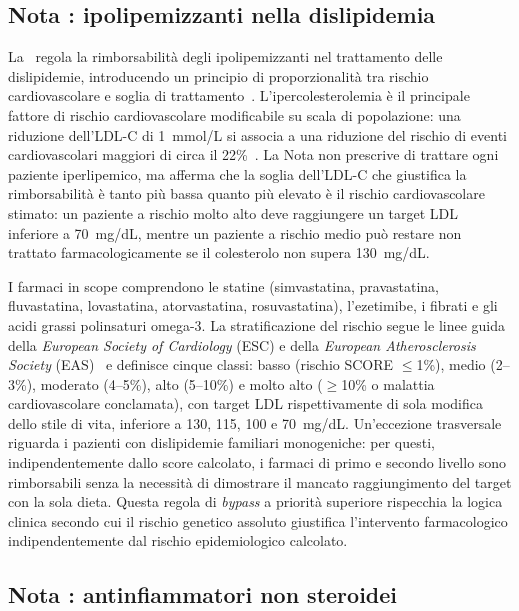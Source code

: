\subsection{Nota \notetredici: ipolipemizzanti nella dislipidemia}
\label{subsec:nota13}

La \notetredici\ regola la rimborsabilità degli ipolipemizzanti nel trattamento
delle dislipidemie, introducendo un principio di proporzionalità tra rischio
cardiovascolare e soglia di trattamento~\cite{aifa2018nota13}.
L'ipercolesterolemia è il principale fattore di rischio cardiovascolare
modificabile su scala di popolazione: una riduzione dell'LDL-C di 1~mmol/L
si associa a una riduzione del rischio di eventi cardiovascolari maggiori di
circa il 22\%~\cite{atp2014cardio}.
La Nota non prescrive di trattare ogni paziente iperlipemico, ma afferma che
la soglia dell'LDL-C che giustifica la rimborsabilità è tanto più bassa quanto
più elevato è il rischio cardiovascolare stimato: un paziente a rischio molto
alto deve raggiungere un target LDL inferiore a 70~mg/dL, mentre un paziente
a rischio medio può restare non trattato farmacologicamente se il colesterolo
non supera 130~mg/dL.

I farmaci in scope comprendono le statine (simvastatina, pravastatina, fluvastatina,
lovastatina, atorvastatina, rosuvastatina), l'ezetimibe, i fibrati e gli acidi
grassi polinsaturi omega-3.
La stratificazione del rischio segue le linee guida della \emph{European Society of Cardiology} (ESC) e della \emph{European Atherosclerosis Society} (EAS)~\cite{escic2019dyslip}
e definisce cinque classi: basso (rischio SCORE $\leq$1\%), medio (2--3\%),
moderato (4--5\%), alto (5--10\%) e molto alto ($\geq$10\% o malattia
cardiovascolare conclamata), con target LDL rispettivamente di sola modifica
dello stile di vita, inferiore a 130, 115, 100 e 70~mg/dL.
Un'eccezione trasversale riguarda i pazienti con dislipidemie familiari
monogeniche: per questi, indipendentemente dallo score calcolato, i farmaci
di primo e secondo livello sono rimborsabili senza la necessità di dimostrare
il mancato raggiungimento del target con la sola dieta.
Questa regola di \emph{bypass} a priorità superiore rispecchia la logica clinica
secondo cui il rischio genetico assoluto giustifica l'intervento farmacologico
indipendentemente dal rischio epidemiologico calcolato.

\subsection{Nota \notesessanta: antinfiammatori non steroidei}
\label{subsec:nota66}

